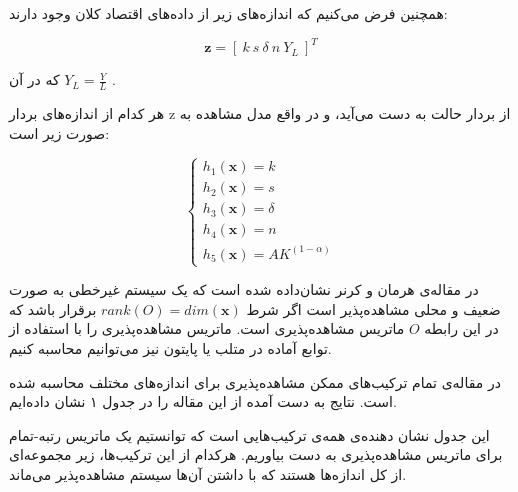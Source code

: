 \documentclass[11pt, fleqn]{article}
\begin{document}
\begin{multicols}{2}
همچنین فرض می‌کنیم که اندازه‌های زیر از داده‌های اقتصاد کلان وجود دارند:

\useshortskip
\begin{LTR}
\begin{equation}
\mathbf{z} = [\ k \ s \ \delta \ n \ Y_L \ ]^T
\end{equation}
\end{LTR}


که در آن 
 $Y_L = \frac{Y}{L}$
  . 

	هر کدام از اندازه‌های بردار z از بردار حالت به دست می‌آید، و در واقع مدل مشاهده به صورت زیر است:

\useshortskip
\begin{LTR}
\begin{equation}
\begin{cases}
h_1(\mathbf{x}) = k \\
 h_2(\mathbf{x}) = s \\
  h_3(\mathbf{x}) = \delta \\
   h_4(\mathbf{x}) = n \\
    h_5(\mathbf{x}) = AK^{(1-\alpha)} \end{cases}
\end{equation}
\end{LTR}


	در مقاله‌ی هرمان و کرنر 
نشان‌داده شده است که یک سیستم غیرخطی به صورت ضعیف و محلی مشاهده‌پذیر
 است اگر شرط
$rank(O) = dim(\mathbf{x})$
برقرار باشد که در این رابطه
$O$
 ماتریس مشاهده‌پذیری
 است. ماتریس مشاهده‌پذیری را با استفاده از توابع آماده در متلب یا پایتون نیز می‌توانیم محاسبه کنیم.
 
 
در مقاله‌ی 
\cite{main}
تمام ترکیب‌های ممکن مشاهده‌‌پذیری برای اندازه‌های مختلف محاسبه شده است. نتایج به دست آمده از این مقاله را در جدول ۱ نشان داده‌ایم.



این جدول نشان دهنده‌ی همه‌ی ترکیب‌هایی است که توانستیم یک ماتریس رتبه-تمام
برای ماتریس مشاهده‌پذیری به دست بیاوریم. هرکدام از این ترکیب‌ها، زیر مجموعه‌ای از کل اندازه‌ها هستند که با داشتن آن‌ها سیستم مشاهده‌پذیر می‌ماند. 





\end{multicols}
\end{document}
